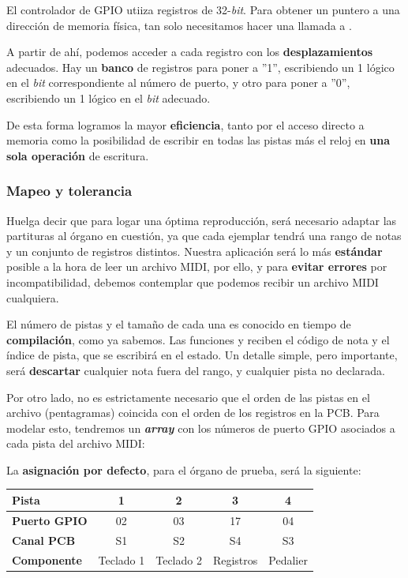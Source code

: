 \smallskip

El controlador de \acrshort{GPIO} utiiza registros de 32-\textit{bit}. Para obtener un puntero a una dirección de memoria física, tan solo necesitamos hacer una llamada a  \cite{soii}. 

A partir de ahí, podemos acceder a cada registro con los \textbf{desplazamientos} adecuados. Hay un \textbf{banco} de registros para poner a ''1'', escribiendo un 1 lógico en el \textit{bit} correspondiente al número de puerto, y otro para poner a ''0'', escribiendo un 1 lógico en el \textit{bit} adecuado.

De esta forma logramos la mayor \textbf{eficiencia}, tanto por el acceso directo a memoria como la posibilidad de escribir en todas las pistas más el reloj en \textbf{una sola operación} de escritura.

\subsubsection{Mapeo y tolerancia}

Huelga decir que para logar una óptima reproducción, será necesario adaptar las partituras al órgano en cuestión, ya que cada ejemplar tendrá una rango de notas y un conjunto de registros distintos. Nuestra aplicación será lo más \textbf{estándar} posible a la hora de leer un archivo \acrshort{MIDI}, por ello, y para \textbf{evitar errores} por incompatibilidad, debemos contemplar que podemos recibir un archivo \acrshort{MIDI} cualquiera.

El número de pistas y el tamaño de cada una es conocido en tiempo de \textbf{compilación}, como ya sabemos. Las funciones  y  reciben el código de nota y el índice de pista, que se escribirá en el estado. Un detalle simple, pero importante, será \textbf{descartar} cualquier nota fuera del rango, y cualquier pista no declarada.

Por otro lado, no es estrictamente necesario que el orden de las pistas en el archivo (pentagramas) coincida con el orden de los registros en la \acrshort{PCB}. Para modelar esto, tendremos un \textbf{\textit{array}} con los números de puerto \acrshort{GPIO} asociados a cada pista del archivo \acrshort{MIDI}:

La \textbf{asignación por defecto}, para el órgano de prueba, será la siguiente:

\smallskip

\begin{center}
	\begin{tabular}{|l|c|c|c|c|}
		\hline \textbf{Pista} & 1 & 2 & 3 & 4 \\
		\hline \textbf{Puerto GPIO} & 02 & 03 & 17 & 04 \\
		\hline \textbf{Canal PCB} & S1 & S2 & S4 & S3 \\
		\hline \textbf{Componente} & Teclado 1 & Teclado 2 & Registros & Pedalier \\
		\hline 
	\end{tabular}
	\smallskip
\end{center}

